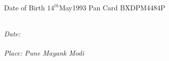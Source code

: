 \begin{cvhonors}
  \cvhonor
    {Date of Birth}
    {\hspace{1.4cm}$14^{th}$May1993}
    {}
    {}
  \cvhonor
    {Pan Card}
    {\hspace{1.8cm}BXDPM4484P}
    {}
    {}
\end{cvhonors}
\begin{flushleft}
\emph{\\Date: }\\
\emph{\\Place: Pune \hspace{11.5cm}Mayank Modi}
\end{flushleft}
